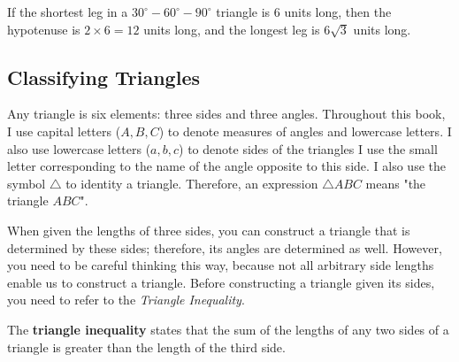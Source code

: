 \begin{example}
	If the shortest leg in a $30^{\circ}-60^{\circ}-90^{\circ}$ triangle is $6$
	units long, then the hypotenuse is $2 \times 6 = 12$ units long, and the
	longest leg is $6\sqrt{3}$ units long.
\end{example}


\subsection{Classifying Triangles}
\label{sub_sec:classifying_triangles}

Any triangle is six elements: three sides and three angles. Throughout this
book, I use capital letters ($A, B, C$) to denote measures of angles and
lowercase letters. I also use lowercase letters ($a, b, c$) to denote sides of
the triangles I use the small letter corresponding to the name of the angle
opposite to this side. I also use the symbol $\triangle$ to identity a
triangle. Therefore, an expression $\triangle ABC$ means "the triangle $ABC$".

\begin{figure}[htpb]
	\centering


	\label{fig:generic_triangle}
\end{figure}

When given the lengths of three sides, you can construct a triangle that is
determined by these sides; therefore, its angles are determined as well.
However, you need to be careful thinking this way, because not all arbitrary
side lengths enable us to construct a triangle. Before constructing a triangle
given its sides, you need to refer to the \textit{Triangle Inequality}.

\begin{definition}
	\label{def:triangle_inequality}

	The \textbf{triangle inequality} states that the sum of the lengths of any
	two sides of a triangle is greater than the length of the third side.
\end{definition}

